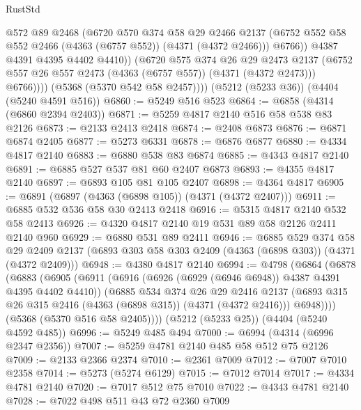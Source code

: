 \begin{lexlean}{RustStd}
\begin{coremodule}
                    @572
                    @89
                    @2468
                    (@6720
                      @570
                      @374
                      @58
                      @29
                      @2466
                      @2137
                      (@6752 @552 @58 @552 @2466 (@4363 (@6757 @552)) (@4371 (@4372 @2466)))
                      @6766))
                  @4387
                  @4391
                  @4395
                  @4402
                  @4410))
              (@6720
                @575
                @374
                @26
                @29
                @2473
                @2137
                (@6752 @557 @26 @557 @2473 (@4363 (@6757 @557)) (@4371 (@4372 @2473)))
                @6766))))
        (@5368 (@5370 @542 @58 @2457))))
    (@5212 (@5233 @36))
    (@4404 (@5240 @4591 @516))
@6860 := @5249 @516 @523
@6864 := @6858 (@4314 (@6860 @2394 @2403))
@6871 := @5259 @4817 @2140 @516 @58 @538 @83 @2126
@6873 := @2133 @2413 @2418
@6874 := @2408 @6873
@6876 := @6871 @6874 @2405
@6877 := @5273 @6331
@6878 := @6876 @6877
@6880 := @4334 @4817 @2140
@6883 := @6880 @538 @83 @6874
@6885 := @4343 @4817 @2140
@6891 := @6885 @527 @537 @81 @60 @2407 @6873
@6893 := @4355 @4817 @2140
@6897 := @6893 @105 @81 @105 @2407
@6898 := @4364 @4817
@6905 := @6891 (@6897 (@4363 (@6898 @105)) (@4371 (@4372 @2407)))
@6911 := @6885 @532 @536 @58 @30 @2413 @2418
@6916 := @5315 @4817 @2140 @532 @58 @2413
@6926 := @4320 @4817 @2140 @19 @531 @89 @58 @2126 @2411 @2140 @960
@6929 := @6880 @531 @89 @2411
@6946 := @6885
    @529
    @374
    @58
    @29
    @2409
    @2137
    (@6893 @303 @58 @303 @2409 (@4363 (@6898 @303)) (@4371 (@4372 @2409)))
@6948 := @4380 @4817 @2140
@6994 := @4798
    (@6864
      (@6878
        (@6883
          (@6905
            (@6911
              (@6916 (@6926 (@6929 (@6946 @6948)) @4387 @4391 @4395 @4402 @4410))
              (@6885
                @534
                @374
                @26
                @29
                @2416
                @2137
                (@6893 @315 @26 @315 @2416 (@4363 (@6898 @315)) (@4371 (@4372 @2416)))
                @6948))))
        (@5368 (@5370 @516 @58 @2405))))
    (@5212 (@5233 @25))
    (@4404 (@5240 @4592 @485))
@6996 := @5249 @485 @494
@7000 := @6994 (@4314 (@6996 @2347 @2356))
@7007 := @5259 @4781 @2140 @485 @58 @512 @75 @2126
@7009 := @2133 @2366 @2374
@7010 := @2361 @7009
@7012 := @7007 @7010 @2358
@7014 := @5273 (@5274 @6129)
@7015 := @7012 @7014
@7017 := @4334 @4781 @2140
@7020 := @7017 @512 @75 @7010
@7022 := @4343 @4781 @2140
@7028 := @7022 @498 @511 @43 @72 @2360 @7009

\end{coremodule}
\end{lexlean}
